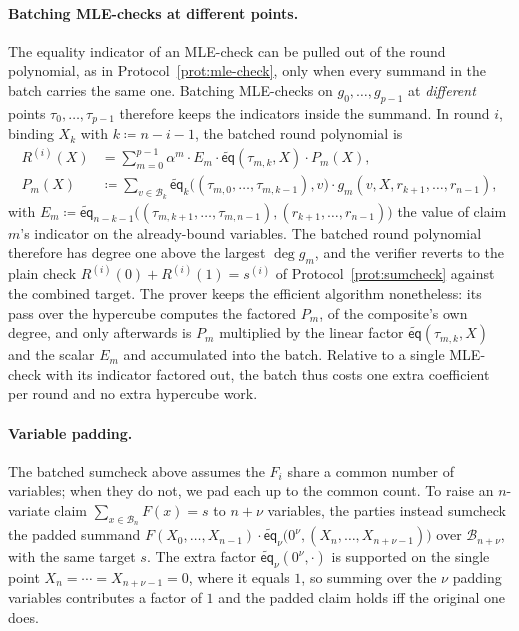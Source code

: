 \documentclass{article}
\theoremstyle{definition}
\newcommand*{\mle}{\widetilde}
\newcommand{\eq}{\mathsf{eq}}
\newcommand{\BB}{\mathcal{B}}
\begin{document}
\paragraph{Batching MLE-checks at different points.}
\label{sec:batching-mle-checks}
The equality indicator of an MLE-check can be pulled out of the round polynomial, as in Protocol~\ref{prot:mle-check}, only when every summand in the batch carries the same one. Batching MLE-checks on $g_0, \ldots, g_{p - 1}$ at \emph{different} points $\tau_0, \ldots, \tau_{p - 1}$ therefore keeps the indicators inside the summand. In round $i$, binding $X_k$ with $k \coloneqq n - i - 1$, the batched round polynomial is
\begin{align*}
  R^{(i)}(X) &= \sum_{m = 0}^{p - 1} \alpha^m \cdot E_m \cdot \mle{\eq}(\tau_{m, k}, X) \cdot P_m(X), \\
  P_m(X) &\coloneqq \sum_{v \in \BB_k} \mle{\eq}_k\bigl( (\tau_{m, 0}, \ldots, \tau_{m, k - 1}), v \bigr) \cdot g_m(v, X, r_{k + 1}, \ldots, r_{n - 1}),
\end{align*}
with $E_m \coloneqq \mle{\eq}_{n - k - 1}\bigl( (\tau_{m, k + 1}, \ldots, \tau_{m, n - 1}), (r_{k + 1}, \ldots, r_{n - 1}) \bigr)$ the value of claim $m$'s indicator on the already-bound variables. The batched round polynomial therefore has degree one above the largest $\deg g_m$, and the verifier reverts to the plain check $R^{(i)}(0) + R^{(i)}(1) = s^{(i)}$ of Protocol~\ref{prot:sumcheck} against the combined target. The prover keeps the efficient algorithm nonetheless: its pass over the hypercube computes the factored $P_m$, of the composite's own degree, and only afterwards is $P_m$ multiplied by the linear factor $\mle{\eq}(\tau_{m, k}, X)$ and the scalar $E_m$ and accumulated into the batch. Relative to a single MLE-check with its indicator factored out, the batch thus costs one extra coefficient per round and no extra hypercube work.

\paragraph{Variable padding.}
\label{sec:variable-padding}
The batched sumcheck above assumes the $F_i$ share a common number of variables; when they do not, we pad each up to the common count. To raise an $n$-variate claim $\sum_{x \in \BB_n} F(x) = s$ to $n + \nu$ variables, the parties instead sumcheck the padded summand $F(X_0, \ldots, X_{n - 1}) \cdot \mle{\eq}_\nu\bigl( 0^\nu, (X_n, \ldots, X_{n + \nu - 1}) \bigr)$ over $\BB_{n + \nu}$, with the same target $s$. The extra factor $\mle{\eq}_\nu(0^\nu, \cdot)$ is supported on the single point $X_n = \cdots = X_{n + \nu - 1} = 0$, where it equals $1$, so summing over the $\nu$ padding variables contributes a factor of $1$ and the padded claim holds iff the original one does.
\end{document}
